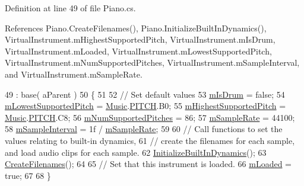Definition at line 49 of file Piano.\+cs.



References Piano.\+Create\+Filenames(), Piano.\+Initialize\+Built\+In\+Dynamics(), Virtual\+Instrument.\+m\+Highest\+Supported\+Pitch, Virtual\+Instrument.\+m\+Is\+Drum, Virtual\+Instrument.\+m\+Loaded, Virtual\+Instrument.\+m\+Lowest\+Supported\+Pitch, Virtual\+Instrument.\+m\+Num\+Supported\+Pitches, Virtual\+Instrument.\+m\+Sample\+Interval, and Virtual\+Instrument.\+m\+Sample\+Rate.


\begin{DoxyCode}
49                                                      : base( aParent )
50     \{
51 
52         \textcolor{comment}{// Set default values}
53         \hyperlink{group___v_i_base_pro_var_ga47dbd8aa02ab32b8f802adfd2d3d81de}{mIsDrum} = \textcolor{keyword}{false};
54         \hyperlink{group___v_i_base_pro_var_ga3cae52b1bcc0178a8a6b03c7aaf7aac8}{mLowestSupportedPitch} = \hyperlink{class_music}{Music}.\hyperlink{group___music_enums_ga508f69b199ea518f935486c990edac1d}{PITCH}.B0;
55         \hyperlink{group___v_i_base_pro_var_ga61fb2c33b53a0f663047779d7ceb18f3}{mHighestSupportedPitch} = \hyperlink{class_music}{Music}.\hyperlink{group___music_enums_ga508f69b199ea518f935486c990edac1d}{PITCH}.C8;
56         \hyperlink{group___v_i_base_pro_var_gafc759a16324cf9b3f230bcbf040afcd2}{mNumSupportedPitches} = 86;
57         \hyperlink{group___v_i_base_pro_var_ga80b3d2ff29b27698eea6bcf2f8ddc5d7}{mSampleRate} = 44100;
58         \hyperlink{group___v_i_base_pro_var_ga20c1d3d25ea666378d72c833d160ae2e}{mSampleInterval} = 1f / \hyperlink{group___v_i_base_pro_var_ga80b3d2ff29b27698eea6bcf2f8ddc5d7}{mSampleRate};
59 
60         \textcolor{comment}{// Call functions to set the values relating to built-in dynamics, }
61         \textcolor{comment}{// create the filenames for each sample, and load audio clips for each sample.}
62         \hyperlink{group___piano_virt_func_ga6bc02528f8808b8a30aa7d5776445a6d}{InitializeBuiltInDynamics}();
63         \hyperlink{group___piano_virt_func_gaafd50f0f04ea7ea4f560accc628b8f1b}{CreateFilenames}();
64 
65         \textcolor{comment}{// Set that this instrument is loaded.}
66         \hyperlink{group___v_i_base_pro_var_ga8978807d1878db5aae91fbd057c46097}{mLoaded} = \textcolor{keyword}{true};
67 
68     \}
\end{DoxyCode}
